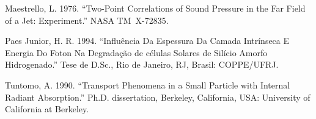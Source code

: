 \documentclass[msc,numbers]{coppe}
\begin{document}
  \leavevmode\hypertarget{ref-techreport-example}{}%
  Maestrello, L. 1976. ``Two-Point Correlations of Sound Pressure in the Far Field of a Jet: Experiment.'' NASA TM~X-72835.
  
  \leavevmode\hypertarget{ref-phdthesis-example}{}%
  Paes Junior, H. R. 1994. ``Influência Da Espessura Da Camada Intrínseca E Energia Do Foton Na Degradação de células Solares de Silício Amorfo Hidrogenado.'' Tese de D.Sc., Rio de Janeiro, RJ, Brasil: COPPE/UFRJ.
  
  \leavevmode\hypertarget{ref-mastersthesis-example}{}%
  Tuntomo, A. 1990. ``Transport Phenomena in a Small Particle with Internal Radiant Absorption.'' Ph.D. dissertation, Berkeley, California, USA: University of California at Berkeley.

  \backmatter
  
  

\end{document}

